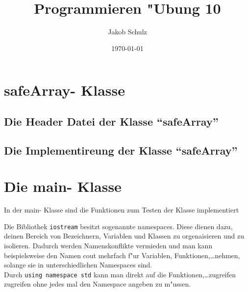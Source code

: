 \documentclass[a4paper,11pt,titlepage]{article}
\begin{document}
\title{Programmieren "Ubung 10}


\author{Jakob Schulz}


\date{\today}

\maketitle{\thispagestyle{plain}}

\section{safeArray- Klasse}
\subsection{Die Header Datei der Klasse "`safeArray"'}

\subsection{Die Implementireung der Klasse "`safeArray"'}

\newpage
\section{Die main- Klasse}
In der main- Klasse sind die Funktionen zum Testen der Klasse implementiert

Die Bibliothek \verb+iostream+ besitzt sogenannte namespaces. Diese dienen dazu, deinen Bereich von Bezeichnern, Variablen und Klassen zu orgenaisieren und zu isolieren. Dadurch werden Namenskonflikte vermieden und man kann beispielsweise den Namen cout mehrfach f"ur Variablen, Funktionen,\dots nehmen, solange sie in unterschiedlichen Namespaces sind.\\
Durch \verb+using namespace std+ kann man direkt auf die Funktionen,\dots zugreifen zugreifen ohne jedes mal den Namespace angeben zu m"ussen.
\end{document}
